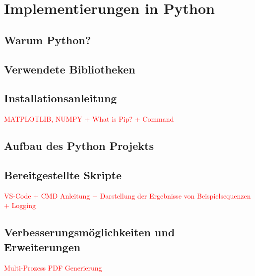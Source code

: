 \chapter{Implementierungen in Python}

\section{Warum Python?}

\section{Verwendete Bibliotheken}

\section{Installationsanleitung}
\textcolor{red}{MATPLOTLIB, NUMPY + What is Pip? + Command}

\section{Aufbau des Python Projekts}






\section{Bereitgestellte Skripte}
\textcolor{red}{VS-Code + CMD Anleitung + Darstellung der Ergebnisse von Beispielsequenzen + Logging}

\section{Verbesserungsmöglichkeiten und Erweiterungen}
\textcolor{red}{Multi-Prozess PDF Generierung}